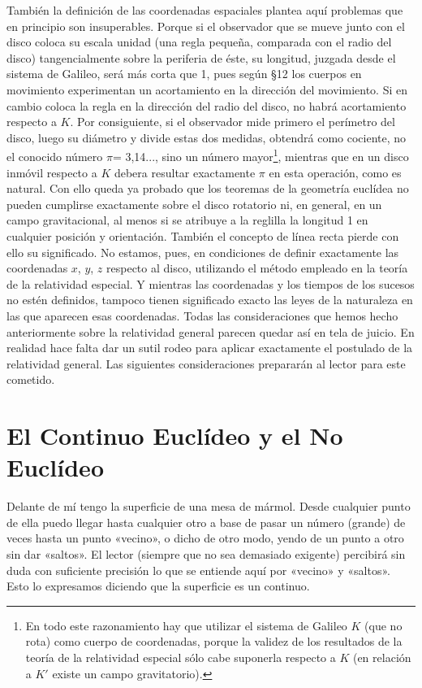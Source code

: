 \documentclass[spanish]{book}
\begin{document}
También la definición de las coordenadas espaciales plantea aquí problemas que en
principio son insuperables. Porque si el observador que se mueve junto con el disco
coloca su escala unidad (una regla pequeña, comparada con el radio del disco)
tangencialmente sobre la periferia de éste, su longitud, juzgada desde el sistema de
Galileo, será más corta que 1, pues según \S 12 los cuerpos en movimiento
experimentan un acortamiento en la dirección del movimiento. Si en cambio coloca la
regla en la dirección del radio del disco, no habrá acortamiento respecto a $K$. Por
consiguiente, si el observador mide primero el perímetro del disco, luego su
diámetro y divide estas dos medidas, obtendrá como cociente, no el conocido número
$\pi$= 3,14..., sino un número mayor\footnote{En todo este razonamiento hay que 
utilizar el sistema de Galileo $K$ (que no rota) como cuerpo de
coordenadas, porque la validez de los resultados de la teoría de la relatividad 
especial sólo cabe suponerla respecto a $K$ (en relación a $K'$ existe un campo 
gravitatorio).}, mientras que en un disco inmóvil respecto a $K$
debera resultar exactamente $\pi$ en esta operación, como es natural. Con ello queda ya
probado que los teoremas de la geometría euclídea no pueden cumplirse exactamente
sobre el disco rotatorio ni, en general, en un campo gravitacional, al menos si se
atribuye a la reglilla la longitud 1 en cualquier posición y orientación. También el
concepto de línea recta pierde con ello su significado. No estamos, pues, en
condiciones de definir exactamente las coordenadas $x$, $y$, $z$ respecto al disco,
utilizando el método empleado en la teoría de la relatividad especial. Y mientras las
coordenadas y los tiempos de los sucesos no estén definidos, tampoco tienen
significado exacto las leyes de la naturaleza en las que aparecen esas coordenadas.
Todas las consideraciones que hemos hecho anteriormente sobre la relatividad
general parecen quedar así en tela de juicio. En realidad hace falta dar un sutil rodeo
para aplicar exactamente el postulado de la relatividad general. Las siguientes
consideraciones prepararán al lector para este cometido.


\chapter{El Continuo Euclídeo y el No Euclídeo}

Delante de mí tengo la superficie de una mesa de mármol. Desde cualquier punto
de ella puedo llegar hasta cualquier otro a base de pasar un número (grande) de
veces hasta un punto «vecino», o dicho de otro modo, yendo de un punto a otro sin
dar «saltos». El lector (siempre que no sea demasiado exigente) percibirá sin duda con
suficiente precisión lo que se entiende aquí por «vecino» y «saltos». Esto lo expresamos
diciendo que la superficie es un continuo.
\end{document}
